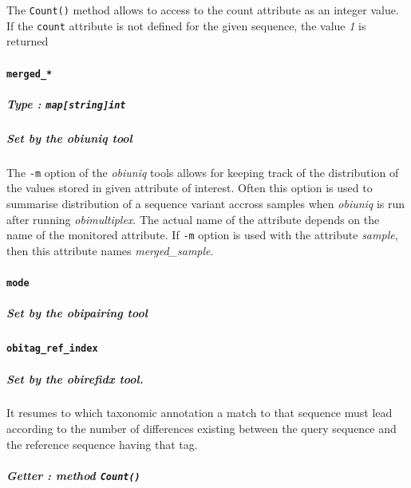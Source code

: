 \documentclass[
  letterpaper,
  DIV=11,
  numbers=noendperiod]{scrreprt}
\let\oldparagraph\paragraph
\renewcommand{\paragraph}[1]{\oldparagraph{#1}\mbox{}}
\let\oldsubparagraph\subparagraph
\renewcommand{\subparagraph}[1]{\oldsubparagraph{#1}\mbox{}}
\begin{document}
The \texttt{Count()} method allows to access to the count attribute as
an integer value. If the \texttt{count} attribute is not defined for the
given sequence, the value \emph{1} is returned

\hypertarget{merged_}{%
\paragraph{\texorpdfstring{\texttt{merged\_*}}{merged\_*}}\label{merged_}}

\hypertarget{type-mapstringint}{%
\subparagraph{\texorpdfstring{Type :
\texttt{map{[}string{]}int}}{Type : map{[}string{]}int}}\label{type-mapstringint}}

\hypertarget{set-by-the-obiuniq-tool-1}{%
\subparagraph{\texorpdfstring{Set by the \emph{obiuniq}
tool}{Set by the obiuniq tool}}\label{set-by-the-obiuniq-tool-1}}

The \texttt{-m} option of the \emph{obiuniq} tools allows for keeping
track of the distribution of the values stored in given attribute of
interest. Often this option is used to summarise distribution of a
sequence variant accross samples when \emph{obiuniq} is run after
running \emph{obimultiplex}. The actual name of the attribute depends on
the name of the monitored attribute. If \texttt{-m} option is used with
the attribute \emph{sample}, then this attribute names
\emph{merged\_sample}.

\hypertarget{mode}{%
\paragraph{\texorpdfstring{\texttt{mode}}{mode}}\label{mode}}

\hypertarget{set-by-the-obipairing-tool-2}{%
\subparagraph{\texorpdfstring{Set by the \emph{obipairing}
tool}{Set by the obipairing tool}}\label{set-by-the-obipairing-tool-2}}

\textbf{\texttt{obitag\_ref\_index}}

\hypertarget{set-by-the-obirefidx-tool.}{%
\subparagraph{\texorpdfstring{Set by the \emph{obirefidx}
tool.}{Set by the obirefidx tool.}}\label{set-by-the-obirefidx-tool.}}

It resumes to which taxonomic annotation a match to that sequence must
lead according to the number of differences existing between the query
sequence and the reference sequence having that tag.

\hypertarget{getter-method-count-1}{%
\subparagraph{\texorpdfstring{Getter : method
\texttt{Count()}}{Getter : method Count()}}\label{getter-method-count-1}}
\end{document}
